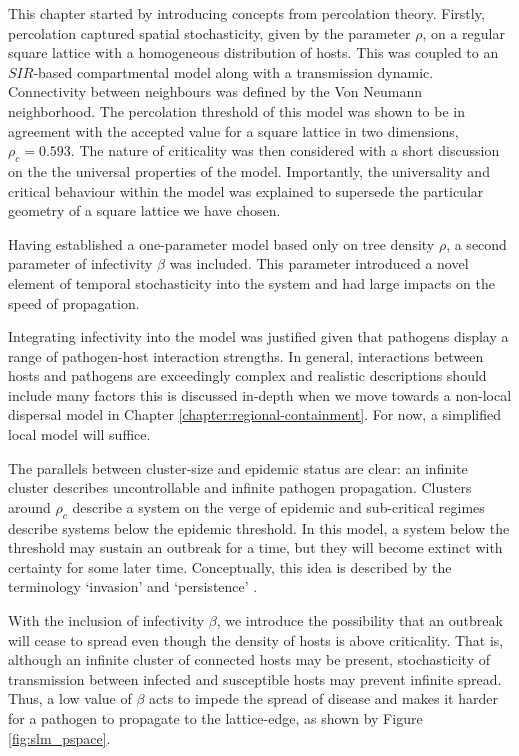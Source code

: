 This chapter started by introducing concepts from percolation theory. %
Firstly, percolation captured spatial stochasticity, given by the parameter $\rho$, on a regular square %
lattice with a homogeneous distribution of hosts. %
This was coupled to an $SIR$-based compartmental model along with a transmission dynamic. %
Connectivity between neighbours was defined by the Von Neumann neighborhood. %
The percolation threshold of this model was shown to be in agreement with the accepted value %
for a square lattice in two dimensions, $\rho_c = 0.593$. The nature of %
criticality was then considered with a short discussion on the  the universal properties of the model. %
Importantly, the universality and critical behaviour within the model was explained to supersede %
the particular geometry of a square lattice we have chosen. %

Having established a one-parameter model based only on tree density $\rho$, a second parameter %
of infectivity $\beta$ was included. %
This parameter introduced a novel element of temporal stochasticity into the system %
and had large impacts on the speed of propagation. %

Integrating infectivity into the model was justified given that pathogens display a range of %
pathogen-host interaction strengths. %
In general, interactions between hosts and pathogens are %
exceedingly complex %
and realistic descriptions should include many factors\textemdash %
this is discussed in-depth when we move towards a non-local dispersal model in Chapter \ref{chapter:regional-containment}. %
For now, a simplified local model will suffice. %


The parallels between cluster-size and epidemic status are clear: %
 an infinite cluster describes %
uncontrollable and infinite pathogen propagation. Clusters around $\rho_c$ describe a system %
on the verge of epidemic and sub-critical regimes describe systems below the epidemic threshold. %
In this model, a system below the threshold may sustain an outbreak for a time, but they will %
become extinct with certainty for some later time. %
Conceptually, this idea is described by the terminology `invasion' and `persistence' \cite{gilligan2008epidemiological}. %
 
With the inclusion of infectivity $\beta$, we introduce the possibility that an outbreak will %
cease to spread even though the density of hosts is above criticality. %
That is, although an infinite cluster of connected hosts may be present,  %
stochasticity of transmission between infected and susceptible hosts may prevent infinite spread. %
Thus, a low value of $\beta$ acts to impede the spread of disease and makes it harder for a pathogen %
to propagate to the lattice-edge, as shown by Figure \ref{fig:slm_pspace}. %

